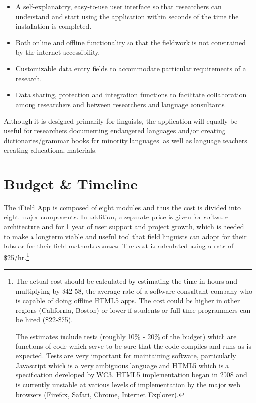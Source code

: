 \documentclass[12 pt]{article}
\begin{document}
\begin{itemize} 
\item A self-explanatory, easy-to-use user interface so that researchers can understand and start using the application  within seconds of  the time the installation is completed.  
\item Both online and offline functionality so that the fieldwork is not constrained by the internet accessibility. 
\item Customizable data entry fields to accommodate particular requirements of a research.  
\item Data sharing, protection and integration functions to facilitate collaboration among researchers and between researchers and language consultants. 

\end{itemize} 


Although it is designed primarily for linguists, the application will equally be useful for researchers documenting endangered languages and/or creating dictionaries/grammar books for minority languages, as well as language teachers creating educational materials.  





\section {Budget \& Timeline}

The iField App is composed of eight modules and thus the cost is divided into eight major components. In addition, a separate price is given for software architecture and for 1 year of user support and project growth, which is needed to make a longterm viable and useful tool that field linguists can adopt for their labs or for their field methods courses. The cost is calculated using a rate of \$25/hr.\footnote{The actual cost should be calculated by estimating the time in hours and multiplying by \$42-58, the average rate of a software consultant company who is capable of doing offline HTML5 apps. The cost could be higher in other regions (California, Boston) or lower if students or full-time programmers can be hired (\$22-\$35).  

The  estimates include tests (roughly 10\% - 20\% of the budget) which are functions of code which serve to be sure that the code compiles and runs as is expected. Tests are very important for maintaining software, particularly Javascript which is a very ambiguous language and HTML5 which is a specification developed by WC3. HTML5 implementation  began in 2008 and is currently unstable at various levels of implementation by the major web browsers (Firefox, Safari, Chrome, Internet Explorer).}
\end{document}
